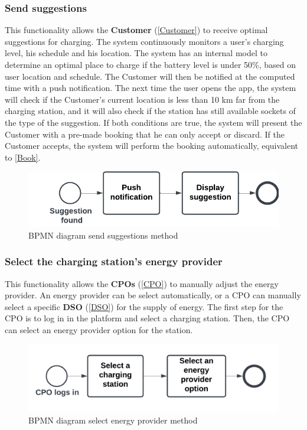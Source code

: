 \subsubsection{Send suggestions}
This functionality allows the \textbf{Customer} (\ref{Customer}) to receive optimal suggestions for charging.
The system continuously monitors a user's charging level, his schedule and his location.
The system has an internal model to determine an optimal place to charge if the battery level is under 50\%, based on user location and schedule.
The Customer will then be notified at the computed time with a push notification. The next time the user opens the app, the system will check if the Customer's current location is less than 10 km far from the charging station, and it will also check if the station has still available sockets of the type of the suggestion. If both conditions are true, the system will present the Customer with a pre-made booking that he can only accept or discard. If the Customer accepts, the system will perform the booking automatically, equivalent to \ref{Book}. 
\begin{figure}[H]
    \begin{center}
        \includegraphics[width=\textwidth]{img/fun-sug.png}
        \caption{BPMN diagram send suggestions method}
    \end{center}
\end{figure}
\subsubsection{Select the charging station's energy provider}
This functionality allows the \textbf{CPOs} (\ref{CPO}) to manually adjust the energy provider. An energy provider can be select automatically, or a CPO can manually select a specific \textbf{DSO} (\ref{DSO}) for the supply of energy. The first step for the CPO is to log in in the platform and select a charging station. Then, the CPO can select an energy provider option for the station.
\begin{figure}[H]
    \begin{center}
        \includegraphics[width=\textwidth]{img/fun-en-prov.png}
        \caption{BPMN diagram select energy provider method}
    \end{center}
\end{figure}
